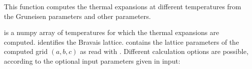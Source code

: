 \documentclass[letterpaper,10pt,english]{sphinxmanual}
\begin{document}

\begin{fulllineitems}
\label{pyqha:pyqha.alphagruneisenp.compute_alpha_gruneisein}
This function computes the thermal expansions at different temperatures from
the Gruneisen parameters and other parameters.

 is a numpy array of temperatures for which the thermal expansions are
computed.  identifies the Bravais lattice.  contains the lattice
parameters of the computed grid \((a,b,c)\) as read with .
Different calculation options are possible, according to the optional 
input parameters given in input:


\end{fulllineitems}
\end{document}
